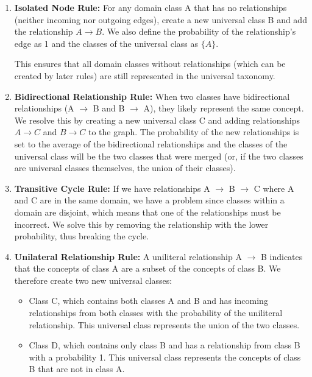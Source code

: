 \begin{enumerate}
    \item \textbf{Isolated Node Rule:} For any domain class A that has no relationships
          (neither incoming nor outgoing edges), create a new universal class B
          and add the relationship $A \rightarrow B$.
          We also define the probability of the relationship's edge as 1 and
          the classes of the universal class as $\{A\}$.

          This ensures that all domain classes without relationships (which can be created by later rules)
          are still represented in the universal taxonomy.

    \item \textbf{Bidirectional Relationship Rule:} When two classes have bidirectional relationships
          (A $\rightarrow$ B and B $\rightarrow$ A), they likely represent the same concept.
          We resolve this by creating a new universal class C and adding relationships
          $A \rightarrow C$ and $B \rightarrow C$ to the graph.
          The probability of the new relationships is set to the average of the bidirectional relationships and the classes of the universal class
          will be the two classes that were merged (or, if the two classes are universal classes themselves,
          the union of their classes).

    \item \textbf{Transitive Cycle Rule:} If we have relationships A $\rightarrow$ B $\rightarrow$ C
          where A and C are in the same domain, we have a problem since classes within a domain
          are disjoint, which means that one of the relationships must be incorrect.
          We solve this by removing the relationship with the lower probability,
          thus breaking the cycle.

    \item \textbf{Unilateral Relationship Rule:} A uniliteral relationship
          A $\rightarrow$ B indicates that the concepts of class A are a subset of the concepts of class B.
          We therefore create two new universal classes:
          \begin{itemize}
              \item Class C, which contains both classes A and B and has incoming relationships
                    from both classes with the probability of the uniliteral relationship.
                    This universal class represents the union of the two classes.
              \item Class D, which contains only class B and has a relationship from class B with a probability 1.
                    This universal class represents the concepts of class B that are not in class A.
          \end{itemize}
\end{enumerate}

